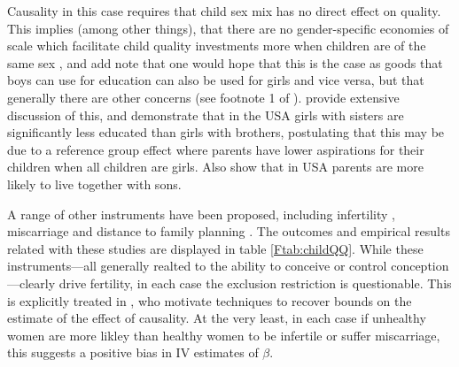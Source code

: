 Causality in this case requires that child sex mix has no direct effect on 
quality.  This implies (among other things), that there are no gender-specific 
economies of scale which facilitate child quality investments more when children
are of the same sex \citep{ButcherCase1994}, and add note that one would hope 
that this is the case as goods that boys can use for education can also be used 
for girls and vice versa, but that generally there are other concerns (see 
footnote 1 of \citet{RosenzweigZhang2009}). \citet{ButcherCase1994} provide 
extensive discussion of this, and demonstrate that in the USA girls with sisters
are significantly less educated than girls with brothers, postulating that this
may be due to a reference group effect where parents have lower aspirations for
their children when all children are girls. Also \citet{DahlMoretti2008} show
that in USA parents are more likely to live together with sons.

A range of other instruments have been proposed, including infertility
\citep{Bougmaetal2015}, miscarriage \citep{Hotzetal1997,Marlani2008,Miller2009}
and distance to family planning \citep{DangRogers2013}. The outcomes and 
empirical results related with these studies are displayed in table 
\ref{Ftab:childQQ}.  While these instruments---all generally realted to the 
ability to conceive or control conception---clearly drive fertility, in each 
case the exclusion restriction is questionable.  This is explicitly treated in
\citet{Hotzetal1997}, who motivate techniques to recover bounds on the estimate
of the effect of causality.  At the very least, in each case if unhealthy
women are more likley than healthy women to be infertile or suffer miscarriage,
this suggests a positive bias in IV estimates of $\beta$.

